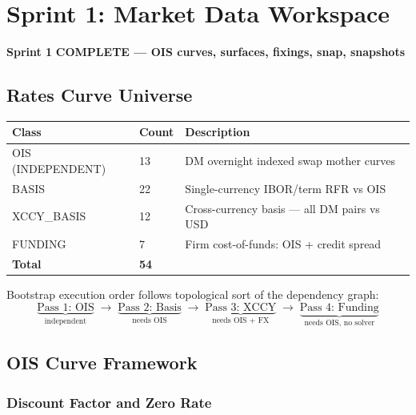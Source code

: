 \documentclass[11pt, a4paper]{article}
\newcommand{\sprintstatus}[3]{%
  \begin{tcolorbox}[sprintbox]
  \small
  \textbf{\color{navy}Sprint #1} \quad
  \textbf{\color{#2}#3}
  \end{tcolorbox}\vspace{4pt}
}
\begin{document}
\section{Sprint 1: Market Data Workspace}

\sprintstatus{1}{teal!70!black}{COMPLETE — OIS curves, surfaces, fixings, snap, snapshots}

\subsection{Rates Curve Universe}

\begin{center}
\begin{tabular}{L{2.8cm} R{1.2cm} L{8cm}}
\toprule
\textbf{Class} & \textbf{Count} & \textbf{Description} \\
\midrule
OIS (INDEPENDENT) & 13 & DM overnight indexed swap mother curves \\
BASIS              & 22 & Single-currency IBOR/term RFR vs OIS \\
XCCY\_BASIS        & 12 & Cross-currency basis — all DM pairs vs USD \\
FUNDING            &  7 & Firm cost-of-funds: OIS + credit spread \\
\midrule
\textbf{Total}     & \textbf{54} & \\
\bottomrule
\end{tabular}
\end{center}

Bootstrap execution order follows topological sort of the dependency graph:
\begin{equation}
  \underbrace{\text{Pass 1: OIS}}_{\text{independent}}
  \;\to\;
  \underbrace{\text{Pass 2: Basis}}_{\text{needs OIS}}
  \;\to\;
  \underbrace{\text{Pass 3: XCCY}}_{\text{needs OIS + FX}}
  \;\to\;
  \underbrace{\text{Pass 4: Funding}}_{\text{needs OIS, no solver}}
\end{equation}

\subsection{OIS Curve Framework}

\subsubsection{Discount Factor and Zero Rate}
\end{document}
